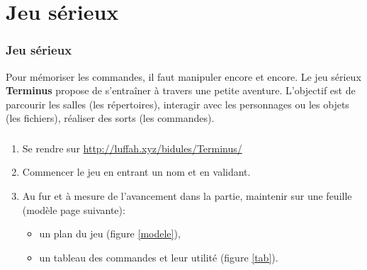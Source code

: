 \documentclass[svgnames,11pt]{beamer}
\begin{document}
\section{Jeu sérieux}
\begin{frame}
    \frametitle{Jeu sérieux}

    Pour mémoriser les commandes, il faut manipuler encore et encore. Le jeu sérieux \textbf{Terminus} propose de s'entraîner à travers une petite aventure. L'objectif est de parcourir les salles (les répertoires), interagir avec les personnages ou les objets (les fichiers), réaliser des sorts (les commandes).

\end{frame}
\begin{frame}
    \frametitle{}

    \begin{activite}
        \begin{enumerate}
            \item Se rendre sur \url{http://luffah.xyz/bidules/Terminus/}
            \item Commencer le jeu en entrant un nom et en validant.
            \item Au fur et à mesure de l'avancement dans la partie, maintenir sur une feuille (modèle page suivante):
            \begin{itemize}
                \item un plan du jeu (figure \ref{modele}),
                \item un tableau des commandes et leur utilité (figure \ref{tab}).
            \end{itemize}
        \end{enumerate}
        \end{activite}

\end{frame}
\end{document}

